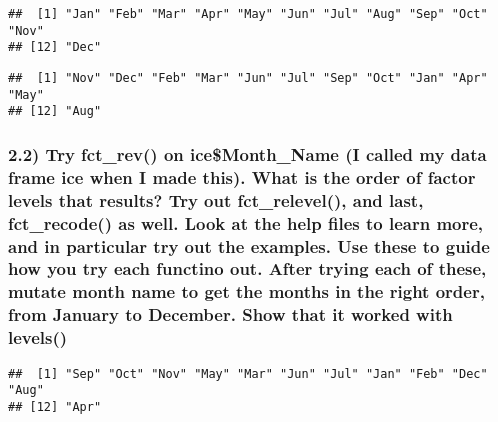 \documentclass[]{article}
\newenvironment{Shaded}{\begin{snugshade}}{\end{snugshade}}
\newcommand{\KeywordTok}[1]{\textcolor[rgb]{0.13,0.29,0.53}{\textbf{#1}}}
\newcommand{\DataTypeTok}[1]{\textcolor[rgb]{0.13,0.29,0.53}{#1}}
\newcommand{\OtherTok}[1]{\textcolor[rgb]{0.56,0.35,0.01}{#1}}
\newcommand{\OperatorTok}[1]{\textcolor[rgb]{0.81,0.36,0.00}{\textbf{#1}}}
\newcommand{\NormalTok}[1]{#1}
\begin{document}
\begin{verbatim}
##  [1] "Jan" "Feb" "Mar" "Apr" "May" "Jun" "Jul" "Aug" "Sep" "Oct" "Nov"
## [12] "Dec"
\end{verbatim}

\begin{Shaded}
\end{Shaded}

\begin{verbatim}
##  [1] "Nov" "Dec" "Feb" "Mar" "Jun" "Jul" "Sep" "Oct" "Jan" "Apr" "May"
## [12] "Aug"
\end{verbatim}

\subsubsection{2.2) Try fct\_rev() on ice\$Month\_Name (I called my data
frame ice when I made this). What is the order of factor levels that
results? Try out fct\_relevel(), and last, fct\_recode() as well. Look
at the help files to learn more, and in particular try out the examples.
Use these to guide how you try each functino out. After trying each of
these, mutate month name to get the months in the right order, from
January to December. Show that it worked with
levels()}\label{try-fct_rev-on-icemonth_name-i-called-my-data-frame-ice-when-i-made-this.-what-is-the-order-of-factor-levels-that-results-try-out-fct_relevel-and-last-fct_recode-as-well.-look-at-the-help-files-to-learn-more-and-in-particular-try-out-the-examples.-use-these-to-guide-how-you-try-each-functino-out.-after-trying-each-of-these-mutate-month-name-to-get-the-months-in-the-right-order-from-january-to-december.-show-that-it-worked-with-levels}

\begin{Shaded}
\end{Shaded}

\begin{verbatim}
##  [1] "Sep" "Oct" "Nov" "May" "Mar" "Jun" "Jul" "Jan" "Feb" "Dec" "Aug"
## [12] "Apr"
\end{verbatim}
\end{document}
